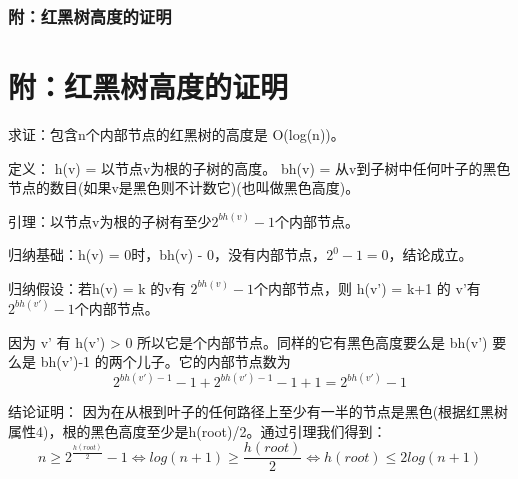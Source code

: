 \documentclass{beamer}
\begin{document}
\begin{frame}
\frametitle{附：红黑树高度的证明}
\section{附：红黑树高度的证明}
求证：包含n个内部节点的红黑树的高度是 O(log(n))。\par
定义：
h(v) = 以节点v为根的子树的高度。
bh(v) = 从v到子树中任何叶子的黑色节点的数目(如果v是黑色则不计数它)(也叫做黑色高度)。\par
\end{frame}
\begin{frame}
引理：以节点v为根的子树有至少$2^{bh(v) }− 1$个内部节点。\par
归纳基础：h(v) = 0时，bh(v) - 0，没有内部节点，$2^0-1=0$，结论成立。\par
归纳假设：若h(v) = k 的v有 $2^{bh(v)} − 1 $个内部节点，则 h(v') = k+1 的 v'有$2^{bh(v')}− 1 $个内部节点。\par
因为 v' 有 h(v') > 0 所以它是个内部节点。同样的它有黑色高度要么是 bh(v') 要么是 bh(v')-1 的两个儿子。它的内部节点数为
\[2^{bh(v') − 1} − 1 + 2^{bh(v') − 1} − 1 + 1 = 2^{bh(v')} − 1\]\par
结论证明：
因为在从根到叶子的任何路径上至少有一半的节点是黑色(根据红黑树属性4)，根的黑色高度至少是h(root)/2。通过引理我们得到：
\[
n\geq 2^{\frac{h(root)}{2}}-1 \Leftrightarrow log(n+1) \geq \frac{h(root)}{2} \Leftrightarrow h(root)\leq 2log(n+1)
\]
\end{frame}
\end{document}
